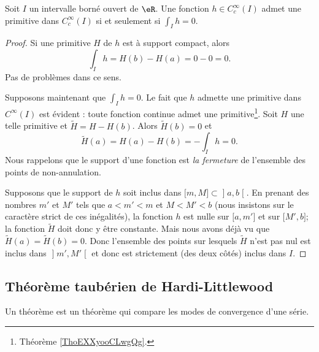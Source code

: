\begin{proposition} \label{PropHFWNpRb}
    Soit \( I \) un intervalle borné ouvert de \( \eR\). Une fonction \( h\in C^{\infty}_c(I)\) admet une primitive dans \(  C^{\infty}_c(I)\) si et seulement si \( \int_Ih=0\).
\end{proposition}

\begin{proof}
    Si une primitive \( H\) de \( h\) est à support compact, alors
    \begin{equation}
        \int_Ih=H(b)-H(a)=0-0=0.
    \end{equation}
    Pas de problèmes dans ce sens.

    Supposons maintenant que \( \int_Ih=0\). Le fait que \( h\) admette une primitive dans \(  C^{\infty}(I)\) est évident : toute fonction continue admet une primitive\footnote{Théorème \ref{ThoEXXyooCLwgQg}.}. Soit \( H\) une telle primitive et \( \tilde H=H-H(b)\). Alors \( \tilde H(b)=0\) et 
    \begin{equation}
        \tilde H(a)=H(a)-H(b)=-\int_Ih=0.
    \end{equation}
    Nous rappelons que le support d'une fonction est \emph{la fermeture} de l'ensemble des points de non-annulation.

    Supposons que le support de \( h\) soit inclus dans \( \mathopen[ m , M \mathclose]\subset\mathopen] a , b \mathclose[\). En prenant des nombres \( m'\) et \( M'\) tels que \( a<m'<m\) et \( M<M'<b\) (nous insistons sur le caractère strict de ces inégalités), la fonction \( h\) est nulle sur \( \mathopen[ a , m' \mathclose]\) et sur \( \mathopen[ M' , b \mathclose]\); la fonction \( \tilde H\) doit donc y être constante. Mais nous avons déjà vu que \( \tilde H(a)=\tilde H(b)=0\). Donc l'ensemble des points sur lesquels \( \tilde H\) n'est pas nul est inclus dans \( \mathopen] m' , M' \mathclose[\) et donc est strictement (des deux côtés) inclus dans \( I\).
\end{proof}

\subsection{Théorème taubérien de Hardi-Littlewood}

Un théorème  est un théorème qui compare les modes de convergence d'une série.

